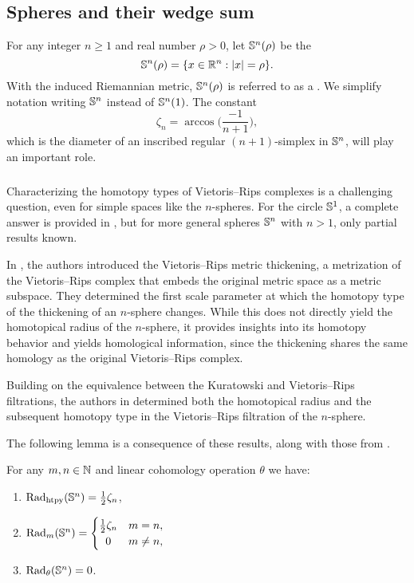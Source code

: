 
\subsection{Spheres and their wedge sum}\label{ss:Sn}\label{sub:Sn and wedge sum}

For any integer $n \geq 1$ and real number $\rho > 0$, let $\mathbb{S}^n(\rho)$ be the 
\[
\mathbb{S}^n(\rho) = \{x \in \mathbb{R}^n : \lvert x\rvert = \rho\}.
\]
With the induced Riemannian metric, \(\mathbb{S}^n(\rho)\) is referred to as a .
We simplify notation writing \(\mathbb{S}^n\) instead of \(\mathbb{S}^n(1)\).
The constant
\[\zeta_n = \arccos\Big(\frac{-1}{n+1}\Big),\]
which is the diameter of an inscribed regular $(n+1)$-simplex in $\mathbb{S}^n$, will play an important role.

\subsubsection{}\label{ss:critical values of Sn}

Characterizing the homotopy types of Vietoris--Rips complexes is a challenging question, even for simple spaces like the $n$-spheres. 
For the circle $\mathbb{S}^1$, a complete answer is provided in \cite{adamaszek2017VietorisProduct}, but for more general spheres $\mathbb{S}^n$ with $n>1$, only partial results known.

In \cite{adamaszek2018metric}, the authors introduced the Vietoris--Rips metric thickening, a metrization of the Vietoris--Rips complex that embeds the original metric space as a metric subspace. They determined the first scale parameter at which the homotopy type of the thickening of an \(n\)-sphere changes. 
While this does not directly yield the homotopical radius of the \(n\)-sphere, it provides insights into its homotopy behavior and yields homological information, since the thickening shares the same homology as the original Vietoris–Rips complex.

Building on the equivalence between the Kuratowski and Vietoris--Rips filtrations, the authors in \cite{lim2024vietoris} determined both the homotopical radius and the subsequent homotopy type in the Vietoris--Rips filtration of the \(n\)-sphere.

The following lemma is a consequence of these results, along with those from \cite{katz1983filling}.

\lemma
For any $m,n \in \mathbb{N}$ and linear cohomology operation $\theta$ we have:
\begin{enumerate}
	\item \(\mathrm{Rad}_{\mathrm{htpy}}(\mathbb{S}^n) = \frac{1}{2}\zeta_n\),
	\item \(\firstdeath{m}{\bS^n} =
	\begin{cases}
		\frac{1}{2}\zeta_n & m = n, \\
		\hfil 0 & m \neq n,
	\end{cases}\)
	\item \(\mathrm{Rad}_{\theta}(\mathbb{S}^n) = 0\).
\end{enumerate}

